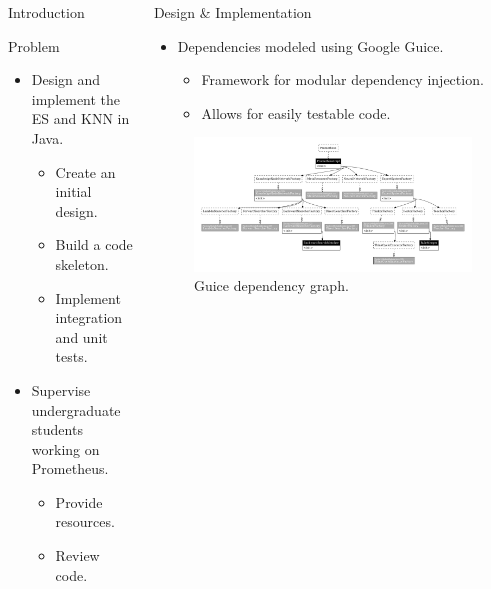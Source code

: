 \documentclass[final]{beamer} %
\newlength{\columnheight}
\begin{document}
\begin{frame}
\begin{columns}
\begin{column}{.3\textwidth}
{\begin{block}{Introduction}
				\end{block}
				\begin{block}{Problem}
				\begin{itemize}
					\item Design and implement the ES and KNN in Java.
					\begin{itemize}
						\item Create an initial design.
						\item Build a code skeleton.
						\item Implement integration and unit tests.
					\end{itemize}
				
					\item Supervise undergraduate students working on Prometheus.
					\begin{itemize}
						\item Provide resources.
						\item Review code.
					\end{itemize}
				\end{itemize}
				\end{block}
			}
			\end{column}
			\begin{column}{.35\textwidth}
				\parbox[t][\columnheight]{\textwidth}{
				\begin{block}{Design \& Implementation}
					\begin{itemize}
						\item Dependencies modeled using Google Guice.
						\begin{itemize}
							\item Framework for modular dependency injection.
							\item Allows for easily testable code.
						\end{itemize}
					\end{itemize}
					
					\begin{figure}[!htb]
						\centering
						\includegraphics[width=\columnwidth]{figures/guice_graph.pdf}
						\caption
						{Guice dependency graph.}
					\end{figure}
					

\end{block}}
\end{column}
\end{columns}
\end{frame}
\end{document}
